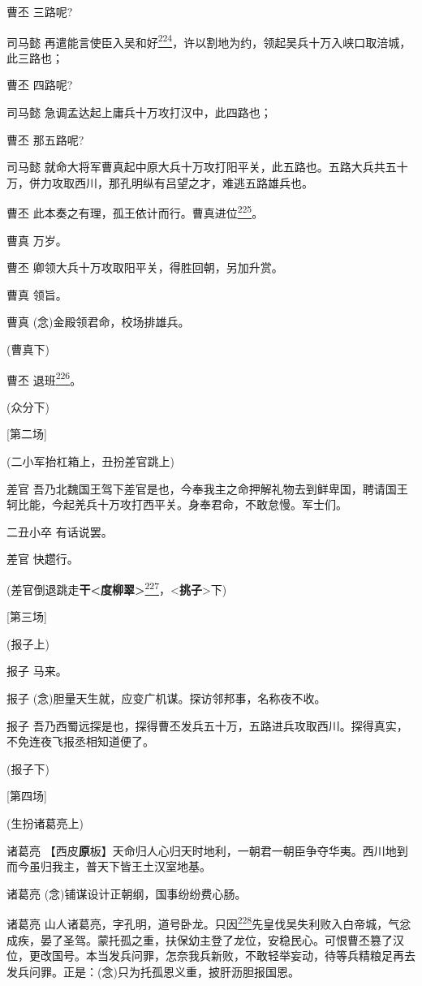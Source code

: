 曹丕 三路呢?

司马懿
再遣能言使臣入吴和好\protect\hyperlink{fn224}{\textsuperscript{224}}，许以割地为约，领起吴兵十万入峡口取涪城，此三路也；

曹丕 四路呢?

司马懿 急调孟达起上庸兵十万攻打汉中，此四路也；

曹丕 那五路呢?

司马懿
就命大将军曹真起中原大兵十万攻打阳平关，此五路也。五路大兵共五十万，併力攻取西川，那孔明纵有吕望之才，难逃五路雄兵也。

曹丕
此本奏之有理，孤王依计而行。曹真进位\protect\hyperlink{fn225}{\textsuperscript{225}}。

曹真 万岁。

曹丕 卿领大兵十万攻取阳平关，得胜回朝，另加升赏。

曹真 领旨。

曹真 (念)金殿领君命，校场排雄兵。

(曹真下)

曹丕 退班\protect\hyperlink{fn226}{\textsuperscript{226}}。

(众分下)

{[}第二场{]}

(二小军抬杠箱上，丑扮差官跳上)

差官
吾乃北魏国王驾下差官是也，今奉我主之命押解礼物去到鲜卑国，聘请国王轲比能，今起羌兵十万攻打西平关。身奉君命，不敢怠慢。军士们。

二丑小卒 有话说罢。

差官 快趱行。

(差官倒退跳走\textbf{干\textless{}度柳翠\textgreater{}}\protect\hyperlink{fn227}{\textsuperscript{227}}，\textless{}\textbf{挑子}\textgreater{}下)

{[}第三场{]}

(报子上)

报子 马来。

报子 (念)胆量天生就，应变广机谋。探访邻邦事，名称夜不收。

报子
吾乃西蜀远探是也，探得曹丕发兵五十万，五路进兵攻取西川。探得真实，不免连夜飞报丞相知道便了。

(报子下)

{[}第四场{]}

(生扮诸葛亮上)

诸葛亮
【西皮\textbf{原}板】天命归人心归天时地利，一朝君一朝臣争夺华夷。西川地到而今虽归我主，普天下皆王土汉室地基。

诸葛亮 (念)铺谋设计正朝纲，国事纷纷费心肠。

诸葛亮
山人诸葛亮，字孔明，道号卧龙。只因\protect\hyperlink{fn228}{\textsuperscript{228}}先皇伐吴失利败入白帝城，气忿成疾，晏了圣驾。蒙托孤之重，扶保幼主登了龙位，安稳民心。可恨曹丕篡了汉位，更改国号。本当发兵问罪，怎奈我兵新败，不敢轻举妄动，待等兵精粮足再去发兵问罪。正是：(念)只为托孤恩义重，披肝沥胆报国恩。

